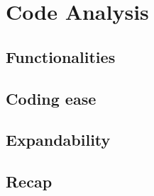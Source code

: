 \chapter{Code Analysis}\label{ch:code}

\section{Functionalities}\label{sc:code:functionalities}

\section{Coding ease}\label{sc:code:ease}

\section{Expandability}\label{sc:code:expandability}

\section{Recap}\label{sc:code:recap}
